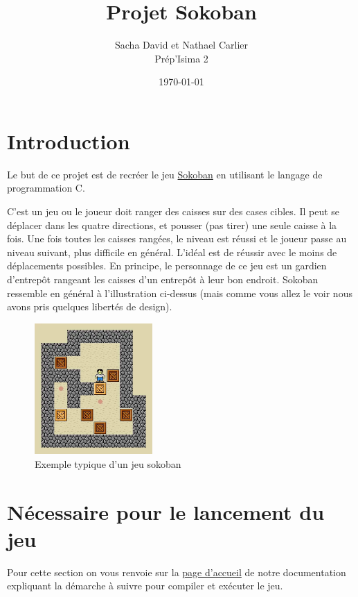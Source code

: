 \documentclass[french, 12pt]{article}
\title{Projet Sokoban}
\author{Sacha David et Nathael Carlier\\
       Prép'Isima 2}
\date{\today}
\begin{document}
\maketitle


\tableofcontents


\section{Introduction}


   Le but de ce projet est de recréer le jeu \href{https://fr.wikipedia.org/wiki/Sokoban}{Sokoban} en utilisant le langage de programmation C.

   C'est un jeu ou le joueur doit ranger des caisses sur des cases cibles. Il peut se déplacer dans les quatre directions, et pousser (pas tirer) une seule caisse à la fois. Une fois toutes les caisses rangées, le niveau est réussi et le joueur passe au niveau suivant, plus difficile en général. L'idéal est de réussir avec le moins de déplacements possibles. En principe, le personnage de ce jeu est un gardien d'entrepôt rangeant les caisses d'un entrepôt à leur bon endroit. Sokoban ressemble en général à l'illustration ci-dessus (mais comme vous allez le voir nous avons pris quelques libertés de design).


   \begin{figure}[h]
       \centering
       \includegraphics[width=0.4\textwidth]{illustration/base_sokoban.png}
       \caption{Exemple typique d'un jeu sokoban}
   \end{figure}


\section{Nécessaire pour le lancement du jeu}


Pour cette section on vous renvoie sur la \href{../doc/redirect.html}{page d'accueil} de notre documentation expliquant la démarche à suivre pour compiler et exécuter le jeu.
\end{document}
